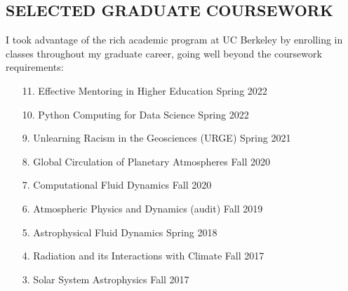 \documentclass[margin, 10pt]{res} %
\begin{document}
\begin{resume}




\section{SELECTED GRADUATE COURSEWORK}

I took advantage of the rich academic program at UC Berkeley by enrolling in classes throughout my graduate career, going well beyond the coursework requirements:

\begin{enumerate}
	
	\item[11.] Effective Mentoring in Higher Education \hfill Spring 2022
	
	\item[10.] Python Computing for Data Science \hfill Spring 2022
	
	\item[9.] Unlearning Racism in the Geosciences (URGE) \hfill Spring 2021
	
	\item[8.] Global Circulation of Planetary Atmospheres \hfill Fall 2020
	
	\item[7.] Computational Fluid Dynamics \hfill Fall 2020
	
	\item[6.] Atmospheric Physics and Dynamics (audit) \hfill Fall 2019
	
	\item[5.] Astrophysical Fluid Dynamics \hfill Spring 2018
	
	\item[4.] Radiation and its Interactions with Climate \hfill Fall 2017
	
	\item[3.] Solar System Astrophysics \hfill Fall 2017
	

\end{enumerate}
\end{resume}
\end{document}

